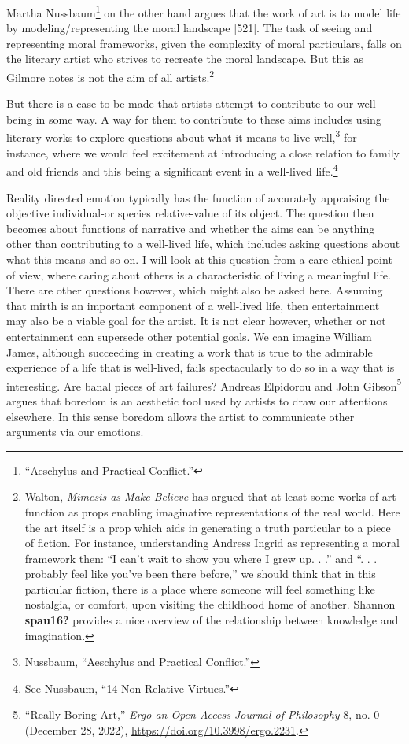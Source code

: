 \documentclass[
  12pt,
]{book}
\theoremstyle{definition}
\theoremstyle{definition}
\theoremstyle{definition}
\theoremstyle{definition}
\theoremstyle{remark}
\begin{document}
Martha Nussbaum\footnote{{``Aeschylus and Practical Conflict.''}} on the other hand argues that the work of art is to model life by modeling/representing the moral landscape {[}521{]}. The task of seeing and representing moral frameworks, given the complexity of moral particulars, falls on the literary artist who strives to recreate the moral landscape. But this as Gilmore notes is not the aim of all artists.\footnote{Walton, \emph{Mimesis as {Make-Believe}} has argued that at least some works of art function as props enabling imaginative representations of the real world. Here the art itself is a prop which aids in generating a truth particular to a piece of fiction. For instance, understanding Andress Ingrid as representing a moral framework then: ``I can't wait to show you where I grew up. . .'' and ``. . . probably feel like you've been there before,'' we should think that in this particular fiction, there is a place where someone will feel something like nostalgia, or comfort, upon visiting the childhood home of another. Shannon \textbf{spau16?} provides a nice overview of the relationship between knowledge and imagination.}

But there is a case to be made that artists attempt to contribute to our well-being in some way. A way for them to contribute to these aims includes using literary works to explore questions about what it means to live well,\footnote{Nussbaum, {``Aeschylus and Practical Conflict.''}} for instance, where we would feel excitement at introducing a close relation to family and old friends and this being a significant event in a well-lived life.\footnote{See Nussbaum, {``14 {Non-Relative Virtues}.''}}

Reality directed emotion typically has the function of accurately appraising the objective individual-or species relative-value of its object. The question then becomes about functions of narrative and whether the aims can be anything other than contributing to a well-lived life, which includes asking questions about what this means and so on. I will look at this question from a care-ethical point of view, where caring about others is a characteristic of living a meaningful life. There are other questions however, which might also be asked here. Assuming that mirth is an important component of a well-lived life, then entertainment may also be a viable goal for the artist. It is not clear however, whether or not entertainment can supersede other potential goals. We can imagine William James, although succeeding in creating a work that is true to the admirable experience of a life that is well-lived, fails spectacularly to do so in a way that is interesting. Are banal pieces of art failures? Andreas Elpidorou and John Gibson\footnote{{``Really {Boring Art},''} \emph{Ergo an Open Access Journal of Philosophy} 8, no. 0 (December 28, 2022), \url{https://doi.org/10.3998/ergo.2231}.} argues that boredom is an aesthetic tool used by artists to draw our attentions elsewhere. In this sense boredom allows the artist to communicate other arguments via our emotions.
\end{document}
